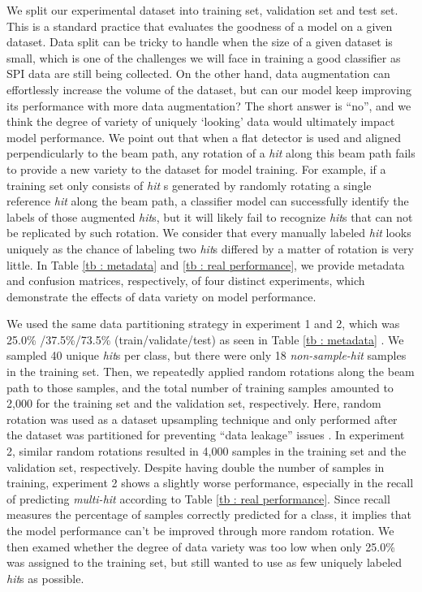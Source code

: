 We split our experimental dataset into training set, validation set and test
set.  This is a standard practice that evaluates the goodness of a model on a
given dataset.  Data split can be tricky to handle when the size of a given
dataset is small, which is one of the challenges we will face in training a good
classifier as SPI data are still being collected.  On the other hand, data
augmentation can effortlessly increase the volume of the dataset, but can our
model keep improving its performance with more data augmentation?  The short
answer is ``no'', and we think the degree of variety of uniquely `looking' data
would ultimately impact model performance.  We point out that when a flat
detector is used and aligned perpendicularly to the beam path, any rotation of a
\textit{hit} along this beam path fails to provide a new variety to the dataset
for model training.  For example, if a training set only consists of \textit{hit}
s generated by randomly rotating a single reference \textit{hit} along the beam
path, a classifier model can successfully identify the labels of those augmented
\textit{hit}s, but it will likely fail to recognize \textit{hit}s that can not
be replicated by such rotation.  We consider that every manually labeled
\textit{hit} looks uniquely as the chance of labeling two \textit{hit}s differed
by a matter of rotation is very little.  In Table \ref{tb : metadata} and
\ref{tb : real performance}, we provide metadata and confusion matrices,
respectively, of four distinct experiments, which demonstrate the effects of
data variety on model performance.  

We used the same data partitioning strategy in experiment 1 and 2, which was
25.0\% /37.5\%/73.5\% (train/validate/test) as seen in Table \ref{tb : metadata}
.  We sampled 40 unique \textit{hit}s per class, but there were only 18
\textit{non-sample-hit} samples in the training set.  Then, we repeatedly
applied random rotations along the beam path to those samples, and the total
number of training samples amounted to 2,000 for the training set and the
validation set, respectively.  Here, random rotation was used as a dataset
upsampling technique and only performed after the dataset was partitioned for
preventing ``data leakage'' issues \cite{kapoorLeakageReproducibilityCrisis2022}
.  In experiment 2, similar random rotations resulted in 4,000 samples in the
training set and the validation set, respectively.  Despite having double the
number of samples in training, experiment 2 shows a slightly worse performance,
especially in the recall of predicting \textit{multi-hit} according to Table
\ref{tb : real performance}.  Since recall measures the percentage of samples
correctly predicted for a class, it implies that the model performance can't be
improved through more random rotation.  We then examed whether the degree of
data variety was too low when only 25.0\% was assigned to the training set, but
still wanted to use as few uniquely labeled \textit{hit}s as possible.  

